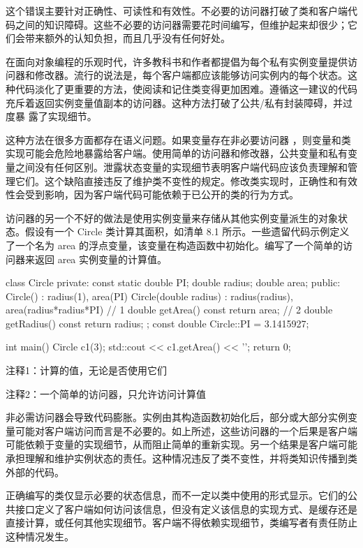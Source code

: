 这个错误主要针对正确性、可读性和有效性。不必要的访问器打破了类和客户端代码之间的知识障碍。这些不必要的访问器需要花时间编写，但维护起来却很少；它们会带来额外的认知负担，而且几乎没有任何好处。

在面向对象编程的乐观时代，许多教科书和作者都提倡为每个私有实例变量提供访问器和修改器。流行的说法是，每个客户端都应该能够访问实例内的每个状态。这种代码淡化了更重要的方法，使阅读和记住类变得更加困难。遵循这一建议的代码充斥着返回实例变量值副本的访问器。这种方法打破了公共/私有封装障碍，并过度暴 露了实现细节。


这种方法在很多方面都存在语义问题。如果变量存在非必要访问器 ，则变量和类实现可能会危险地暴露给客户端。使用简单的访问器和修改器，公共变量和私有变量之间没有任何区别。泄露状态变量的实现细节表明客户端代码应该负责理解和管理它们。这个缺陷直接违反了维护类不变性的规定。修改类实现时，正确性和有效性会受到影响，因为客户端代码可能依赖于已公开的类的行为方式。

访问器的另一个不好的做法是使用实例变量来存储从其他实例变量派生的对象状态。假设有一个 Circle 类计算其面积，如清单 8.1 所示。一些遗留代码示例定义了一个名为 area 的浮点变量，该变量在构造函数中初始化。编写了一个简单的访问器来返回 area 实例变量的计算值。


\begin{cpp}
class Circle {
private:
  const static double PI;
  double radius;
  double area;
public:
  Circle() : radius(1), area(PI) {}
  Circle(double radius) : radius(radius),
    area(radius*radius*PI) {} // 1
  double getArea() const { return area; } // 2
  double getRadius() const { return radius; }
};
const double Circle::PI = 3.1415927;

int main() {
  Circle c1(3);
  std::cout << c1.getArea() << '\n';
  return 0;
}
\end{cpp}

{\footnotesize
注释1：计算的值，无论是否使用它们

注释2：一个简单的访问器，只允许访问计算值
}

非必需访问器会导致代码膨胀。实例由其构造函数初始化后，部分或大部分实例变量可能对客户端访问而言是不必要的。如上所述，这些访问器的一个后果是客户端可能依赖于变量的实现细节，从而阻止简单的重新实现。另一个结果是客户端可能承担理解和维护实例状态的责任。这种情况违反了类不变性，并将类知识传播到类外部的代码。


正确编写的类仅显示必要的状态信息，而不一定以类中使用的形式显示。它们的公共接口定义了客户端如何访问该信息，但没有定义该信息的实现方式、是缓存还是直接计算，或任何其他实现细节。客户端不得依赖实现细节，类编写者有责任防止这种情况发生。

